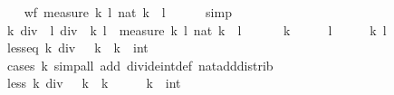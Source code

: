 \begin{isabellebody}
\ \ \isamarkupfalse%
\ {\isacartoucheopen}wf\ {\isacharparenleft}{\kern0pt}measure\ {\isacharparenleft}{\kern0pt}{\isasymlambda}{\isacharparenleft}{\kern0pt}k{\isacharcomma}{\kern0pt}\ l{\isacharparenright}{\kern0pt}{\isachardot}{\kern0pt}\ nat\ {\isacharparenleft}{\kern0pt}{\isasymbar}k{\isasymbar}\ {\isacharplus}{\kern0pt}\ {\isasymbar}l{\isasymbar}{\isacharparenright}{\kern0pt}{\isacharparenright}{\kern0pt}{\isacharparenright}{\kern0pt}{\isacartoucheclose}\isanewline
\ \ \ \ \isamarkupfalse%
\ simp\isanewline
\ \ \isamarkupfalse%
\ {\isacartoucheopen}{\isacharparenleft}{\kern0pt}{\isacharparenleft}{\kern0pt}k\ div\ {}{\isacharcomma}{\kern0pt}\ l\ div\ {}{\isacharparenright}{\kern0pt}{\isacharcomma}{\kern0pt}\ k{\isacharcomma}{\kern0pt}\ l{\isacharparenright}{\kern0pt}\ {\isasymin}\ measure\ {\isacharparenleft}{\kern0pt}{\isasymlambda}{\isacharparenleft}{\kern0pt}k{\isacharcomma}{\kern0pt}\ l{\isacharparenright}{\kern0pt}{\isachardot}{\kern0pt}\ nat\ {\isacharparenleft}{\kern0pt}{\isasymbar}k{\isasymbar}\ {\isacharplus}{\kern0pt}\ {\isasymbar}l{\isasymbar}{\isacharparenright}{\kern0pt}{\isacharparenright}{\kern0pt}{\isacartoucheclose}\isanewline
\ \ \ \ \ {\isacartoucheopen}{\isasymnot}\ {\isacharparenleft}{\kern0pt}k\ {\isasymin}\ {\isacharbraceleft}{\kern0pt}{}{\isacharcomma}{\kern0pt}\ {\isacharminus}{\kern0pt}\ {}{\isacharbraceright}{\kern0pt}\ {\isasymand}\ l\ {\isasymin}\ {\isacharbraceleft}{\kern0pt}{}{\isacharcomma}{\kern0pt}\ {\isacharminus}{\kern0pt}\ {}{\isacharbraceright}{\kern0pt}{\isacharparenright}{\kern0pt}{\isacartoucheclose}\ \ k\ l\isanewline
\ \ \isamarkupfalse%
\ {\isacharminus}{\kern0pt}\isanewline
\ \ \ \ \isamarkupfalse%
\ less{\isacharunderscore}{\kern0pt}eq{\isacharcolon}{\kern0pt}\ {\isacartoucheopen}{\isasymbar}k\ div\ {}{\isasymbar}\ {\isasymle}\ {\isasymbar}k{\isasymbar}{\isacartoucheclose}\ \ k\ {\isacharcolon}{\kern0pt}{\isacharcolon}{\kern0pt}\ int\isanewline
\ \ \ \ \ \ \isamarkupfalse%
\ {\isacharparenleft}{\kern0pt}cases\ k{\isacharparenright}{\kern0pt}\ {\isacharparenleft}{\kern0pt}simp{\isacharunderscore}{\kern0pt}all\ add{\isacharcolon}{\kern0pt}\ divide{\isacharunderscore}{\kern0pt}int{\isacharunderscore}{\kern0pt}def\ nat{\isacharunderscore}{\kern0pt}add{\isacharunderscore}{\kern0pt}distrib{\isacharparenright}{\kern0pt}\isanewline
\ \ \ \ \isamarkupfalse%
\ less{\isacharcolon}{\kern0pt}\ {\isacartoucheopen}{\isasymbar}k\ div\ {}{\isasymbar}\ {\isacharless}{\kern0pt}\ {\isasymbar}k{\isasymbar}{\isacartoucheclose}\ \ {\isacartoucheopen}k\ {\isasymnotin}\ {\isacharbraceleft}{\kern0pt}{}{\isacharcomma}{\kern0pt}\ {\isacharminus}{\kern0pt}\ {}{\isacharbraceright}{\kern0pt}{\isacartoucheclose}\ \ k\ {\isacharcolon}{\kern0pt}{\isacharcolon}{\kern0pt}\ int\isanewline

\end{isabellebody}
